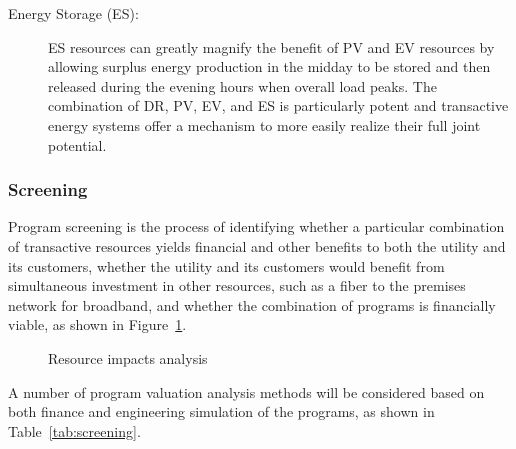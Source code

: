 \documentclass[10pt,twocolumn]{article}
\begin{document}
\begin{description}
    \item[Energy Storage (ES):] ES resources can greatly magnify the benefit of PV and EV resources by allowing surplus energy production in the midday to be stored and then released during the evening hours when overall load peaks.  The combination of DR, PV, EV, and ES is particularly potent and transactive energy systems offer a mechanism to more easily realize their full joint potential.

\end{description}

\subsubsection{Screening}

Program screening is the process of identifying whether a particular combination of transactive resources yields financial and other benefits to both the utility and its customers, whether the utility and its customers would benefit from simultaneous investment in other resources, such as a fiber to the premises network for broadband, and whether the combination of programs is financially viable, as shown in Figure~\ref{fig:impact_analysis}.
\begin{figure}[!t]
    \centerline { \scalebox{0.72} { }}
    \caption{Resource impacts analysis}
    \label{fig:impact_analysis}
\end{figure}
A number of program valuation analysis methods will be considered based on both finance and engineering simulation of the programs, as shown in Table~\ref{tab:screening}. 
\end{document}
